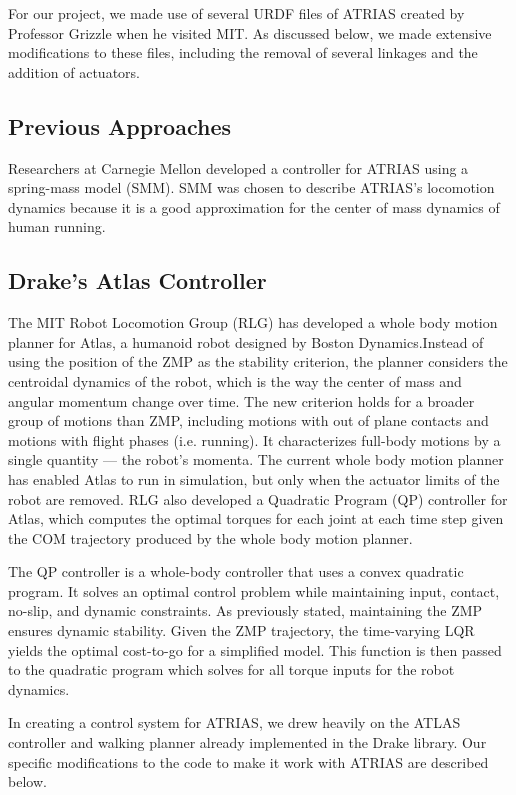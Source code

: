 \documentclass[letterpaper, 10 pt, conference]{ieeeconf}  %
\begin{document}
For our project, we made use of several URDF files of ATRIAS created by Professor Grizzle when he visited MIT. As discussed below, we made extensive modifications to these files, including the removal of several linkages and the addition of actuators.

\subsection{Previous Approaches}

Researchers at Carnegie Mellon developed a controller for ATRIAS using a spring-mass model (SMM). SMM was chosen to describe ATRIAS's locomotion dynamics because it is a good approximation for the center of mass dynamics of human running. \cite{hereid14}

\subsection{Drake's Atlas Controller}

The MIT Robot Locomotion Group (RLG) has developed a whole body motion planner for Atlas, a humanoid robot designed by Boston Dynamics. ​Instead of using ​the position of the ​ZMP as ​the stability criterion, ​the planner considers the centroidal dynamics of the robot, which is the way the center of mass and angular momentum change over time. The new criterion holds for a broader group of motions than ZMP, including motions with out of plane contacts and motions with flight phases (i.e. running). It characterizes full-body motions by a single quantity --- the robot’s momenta. The current whole body motion planner has enabled Atlas to run in simulation, but only when the actuator limits of the robot are removed. \cite{dai14} RLG also developed a Quadratic Program (QP) controller for Atlas, which computes the optimal torques for each joint at each time step given the COM trajectory produced by the whole body motion planner. \cite{kuindersma13}

The QP controller is a whole-body controller that uses a convex quadratic program. It solves an optimal control problem while maintaining input, contact, no-slip, and dynamic constraints. As previously stated, maintaining the ZMP ensures dynamic stability. Given the ZMP trajectory, the time-varying LQR yields the optimal cost-to-go for a simplified model. This function is then passed to the quadratic program which solves for all torque inputs for the robot dynamics.

In creating a control system for ATRIAS, we drew heavily on the ATLAS controller and walking planner already implemented in the Drake library. Our specific modifications to the code to make it work with ATRIAS are described below.
\end{document}
